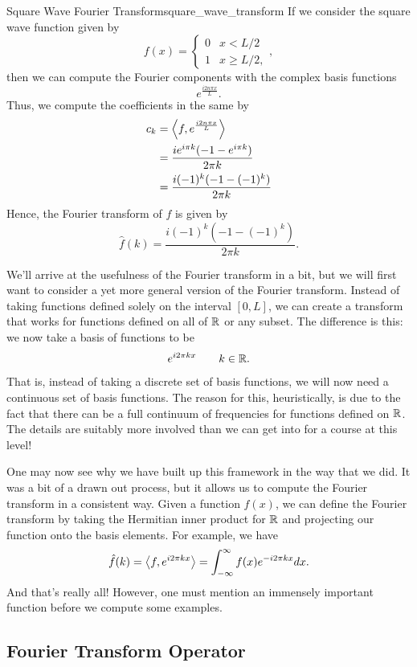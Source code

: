 \begin{ex}{Square Wave Fourier Transform}{square_wave_transform}
	If we consider the square wave function given by
	\[
	f(x) = \begin{cases} 0 & x<L/2 \\ 1 & x\geq L/2, \end{cases},
	\]
	then we can compute the Fourier components with the complex basis functions
	\[
	e^{\frac{ i 2n \pi x}{L}}.
	\]
	Thus, we compute the coefficients in the same by
	\begin{align*}
		c_k &= \left\langle f, e^{\frac{ i 2n \pi x}{L}} \right\rangle\\
		&= \frac{ie^{i \pi k}(-1-e^{i\pi k})}{2\pi k}\\
		&= \frac{i(-1)^k (-1-(-1)^k)}{2\pi k}\\
	\end{align*}
	Hence, the Fourier transform of $f$ is given by
	\[
	\hat{f}(k) =  \frac{i(-1)^k (-1-(-1)^k)}{2\pi k}.
	\]
\end{ex}

We'll arrive at the usefulness of the Fourier transform in a bit, but we will first want to consider a yet more general version of the Fourier transform. Instead of taking functions defined solely on the interval $[0,L]$, we can create a transform that works for functions defined on all of $\mathbb{R}$ or any subset.  The difference is this: we now take a basis of functions to be
\[
e^{i2\pi k x} \qquad k \in \mathbb{R}.
\]
That is, instead of taking a discrete set of basis functions, we will now need a continuous set of basis functions.  The reason for this, heuristically, is due to the fact that there can be a full continuum of frequencies for functions defined on $\mathbb{R}$.  The details are suitably more involved than we can get into for a course at this level!

One may now see why we have built up this framework in the way that we did.  It was a bit of a drawn out process, but it allows us to compute the Fourier transform in a consistent way.  Given a function $f(x)$, we can define the Fourier transform by taking the Hermitian inner product for $\mathbb{R}$ and projecting our function onto the basis elements. For example, we have
\[
\hat{f}(k) = \left\langle f, e^{i2\pi k x} \right\rangle = \int_{-\infty}^\infty f(x)e^{-i2\pi kx}dx.
\]
And that's really all!  However, one must mention an immensely important function before we compute some examples.

\subsection{Fourier Transform Operator}

